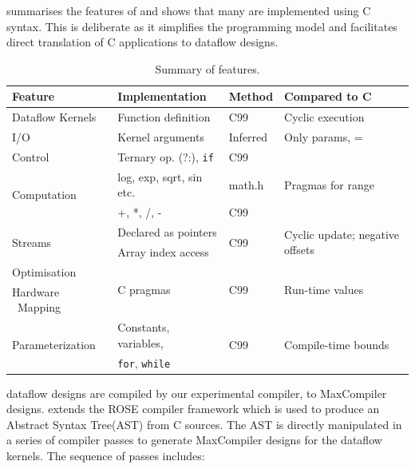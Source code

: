  summarises the features of \FAST{} and
shows that many are implemented using C syntax. This is
deliberate as it simplifies the programming model and facilitates
direct translation of C applications to dataflow designs.

\begin{table}[!h]
 {\small
  \centering
  \renewcommand{\arraystretch}{1.4}
  \begin{tabularx}{\linewidth}{X|X|p{1.4cm}|X}
    \hline
    \bf{Feature}                        & \bf{Implementation}              & \bf{Method}   & \textbf{Compared to C}      \\
    \hline\hline
    Dataflow Kernels & Function definition & C99 & Cyclic execution \\
    \hline
    I/O                               & Kernel arguments              & Inferred        &  Only params, =  \\
    \hline
    Control                           & Ternary op. (?:), \texttt{if} & C99             &     \\
    \hline
    \multirow{2}{*}{Computation}        & log, exp, sqrt, sin etc.                     & math.h           & Pragmas for range      \\
    &  +, *, /, -     & C99         \\
    \hline
    \multirow{2}{*}{Streams}          & Declared as pointers          & \multirow{2}{*}{C99} &  \multirow{2}{3cm}{Cyclic update; negative offsets } \\
    & Array index access     &                      \\
    \hline
    Optimisation                      & \multirow{2}{*}{C pragmas}    & \multirow{2}{*}{C99} & \multirow{2}{*}{Run-time values}\\
    Hardware \  Mapping               &                               &                      & \\
    \hline
    \multirow{2}{*}{Parameterization} & Constants, variables,         & \multirow{2}{*}{C99}  & \multirow{2}{*}{Compile-time bounds} \\
    & \texttt{for}, \texttt{while}  &                     &  \\
  \end{tabularx}
  \caption{Summary of \FAST{} features.}
  \label{table:fast-features}
}
\end{table}


\FAST{} dataflow designs are compiled by our experimental compiler,
\fastc{} to MaxCompiler designs. \fastc{} extends the
ROSE\cite{Quinlan:2000} compiler framework which is used to produce an
Abstract Syntax Tree(AST) from C sources. The AST is directly
manipulated in a series of compiler passes to generate MaxCompiler
designs for the dataflow kernels. The sequence of passes includes:

